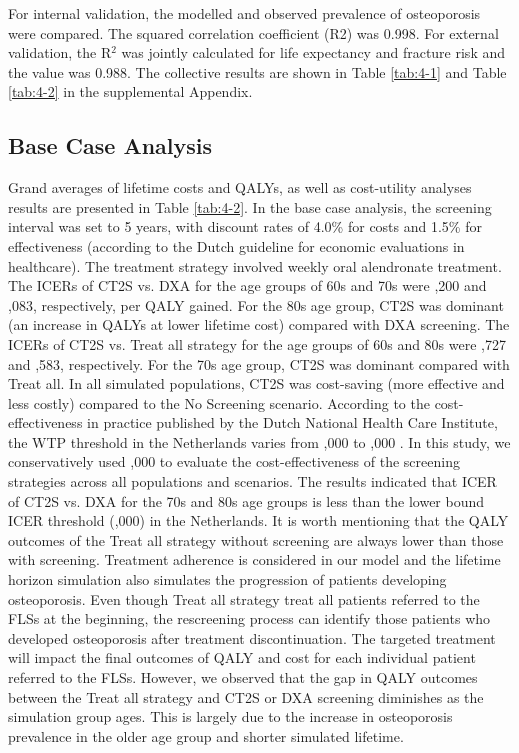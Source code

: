 For internal validation, the modelled and observed prevalence of osteoporosis were compared. The squared correlation coefficient (R2) was 0.998. For external validation, the R$^2$ was jointly calculated for life expectancy and fracture risk and the value was 0.988. The collective results are shown in Table \ref{tab:4-1} and Table \ref{tab:4-2} in the supplemental Appendix.

\subsection{Base Case Analysis}

Grand averages of lifetime costs and QALYs, as well as cost-utility analyses results are presented in Table \ref{tab:4-2}. In the base case analysis, the screening interval was set to 5 years, with discount rates of 4.0\% for costs and 1.5\% for effectiveness (according to the Dutch guideline for economic evaluations in healthcare). The treatment strategy involved weekly oral alendronate treatment. The ICERs of CT2S vs. DXA for the age groups of 60s and 70s were ,200 and ,083, respectively, per QALY gained. For the 80s age group, CT2S was dominant (an increase in QALYs at lower lifetime cost) compared with DXA screening. The ICERs of CT2S vs. Treat all strategy for the age groups of 60s and 80s were ,727 and ,583, respectively. For the 70s age group, CT2S was dominant compared with Treat all. In all simulated populations, CT2S was cost-saving (more effective and less costly)  compared to the No Screening scenario. According to the cost-effectiveness in practice published by the Dutch National Health Care Institute, the WTP threshold in the Netherlands varies from ,000 to ,000 \cite{4-26}. In this study, we conservatively used ,000 to evaluate the cost-effectiveness of the screening strategies across all populations and scenarios. The results indicated that ICER of CT2S vs. DXA for the 70s and 80s age groups is less than the lower bound ICER threshold (,000) in the Netherlands. It is worth mentioning that the QALY outcomes of the Treat all strategy without screening are always lower than those with screening. Treatment adherence is considered in our model and the lifetime horizon simulation also simulates the progression of patients developing osteoporosis. Even though Treat all strategy treat all patients referred to the FLSs at the beginning, the rescreening process can identify those patients who developed osteoporosis after treatment discontinuation. The targeted treatment will impact the final outcomes of QALY and cost for each individual patient referred to the FLSs. However, we observed that the gap in QALY outcomes between the Treat all strategy and CT2S or DXA screening diminishes as the simulation group ages. This is largely due to the increase in osteoporosis prevalence in the older age group and shorter simulated lifetime.

